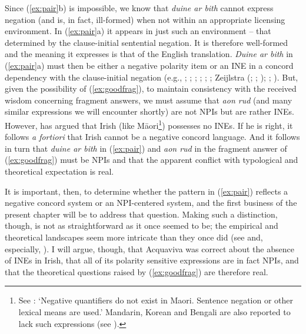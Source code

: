 \documentclass[output=paper,colorlinks,citecolor=brown]{langscibook}
\begin{document}
Since (\ref{ex:pair}b) is impossible, we know that {\itshape duine ar bith} cannot express negation (and is, in fact, ill-formed) when not within an appropriate licensing environment. In (\ref{ex:pair}a) it appears in just such an environment -- that determined by the clause-initial sentential negation. It is therefore well-formed and the meaning it expresses is that of the English translation.  {\itshape Duine ar bith} in (\ref{ex:pair}a) must then be either a negative polarity item or an INE in a concord dependency with the clause-initial negation (e.g., \cite{labov:72}; \cite{laka:90}; \cite{haegeman-zanuttini:91}; \cite{ladusaw:92}; \cite{zanuttini:97}; \cite{penka-zeijlstra:10}; Zeijlstra (\citeyear{hedde:04}; \citeyear{hedde:08}; \citeyear{hedde:16}); \cite{giannakidou-zeijlstra:16}; \cite{deal:22}).  But, given the possibility of (\ref{ex:goodfrag}), to maintain consistency with the received wisdom concerning fragment answers, we must assume that {\itshape aon rud} (and many similar expressions we will encounter shortly) are not NPIs but are rather INEs. However, \citet{jm:acquaviva:96} has argued that Irish (like M\={a}ori\footnote{See \cite[p. 298--289, \S 19.5]{bauer:97}: `Negative quantifiers do not exist in Maori. Sentence negation or other lexical means are used.'  Mandarin, Korean and Bengali are also reported to lack such expressions (see \citealt[15]{hedde:08}).})  possesses no INEs. If he is right, it follows {\itshape a fortiori} that Irish cannot be a negative concord language. And it follows in turn that \textit{duine ar bith} in (\ref{ex:pair}) and \textit{aon rud} in the fragment answer of (\ref{ex:goodfrag}) must be NPIs and that the apparent conflict with typological and theoretical expectation is real.

It is important, then, to determine whether the pattern in (\ref{ex:pair}) reflects a negative concord system or an NPI-centered system, and the first business of the present chapter will be to address that question.  Making such a distinction, though, is not as straightforward as it once seemed to be; the empirical and theoretical landscapes seem more intricate than they once did (see \cite{laka:93} and, especially, \cite{herburger:01}).  I will argue, though, that Acquaviva was correct about the absence of INEs in Irish, that all of its polarity sensitive expressions are in fact NPIs, and that the theoretical questions raised by (\ref{ex:goodfrag}) are therefore real.
\end{document}
